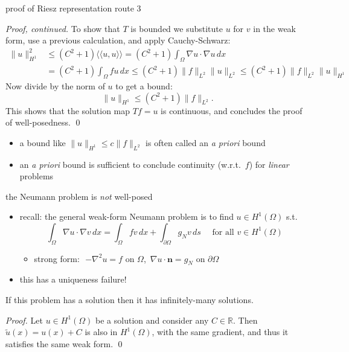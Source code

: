 \documentclass[10pt,
               svgnames,
               hyperref={colorlinks,
                         citecolor=DeepPink4,
                         linkcolor=FireBrick,
                         urlcolor=blue},
               usepdftitle=false]{beamer}
\newcommand{\bn}{\mathbf{n}}
\newcommand{\RR}{\mathbb{R}}
\newcommand{\grad}{\nabla}
\newcommand{\iip}[2]{\langle\!\langle #1, #2 \rangle\!\rangle}
\begin{document}
\begin{frame}{proof of Riesz representation route 3}

\small
\emph{Proof, continued.}
To show that $T$ is bounded we substitute $u$ for $v$ in the weak form, use a previous calculation, and apply Cauchy-Schwarz:
\begin{align*}
\|u\|_{H^1}^2 &\le (C^2+1) \iip{u}{u} = (C^2+1) \int_\Omega \grad u \cdot \grad u\,dx \\
  &= (C^2+1) \int_\Omega f u\,dx \le (C^2+1) \|f\|_{L^2} \|u\|_{L^2} \le (C^2+1) \|f\|_{L^2} \|u\|_{H^1}
\end{align*}
Now divide by the norm of $u$ to get a bound:
    $$\|u\|_{H^1} \le (C^2+1) \|f\|_{L^2}.$$
This shows that the solution map $Tf=u$ is continuous, and concludes the proof of well-posedness. \qed

\bigskip
\bigskip
\begin{itemize}
\item a bound like $\|u\|_{H^1} \le c \|f\|_{L^2}$ is often called an \alert{\emph{a priori} bound}
\item an \emph{a priori} bound is sufficient to conclude continuity (w.r.t.~$f$) for \emph{linear} problems
\end{itemize}
\end{frame}


\begin{frame}{the Neumann problem is \emph{not} well-posed}

\begin{itemize}
\item recall: the general weak-form Neumann problem is to find $u\in H^1(\Omega)$ s.t.
    $$\int_\Omega \grad u \cdot \grad v\,dx = \int_\Omega f v\,dx + \int_{\partial\Omega} g_N v\,ds  \quad \text{ for all } v\in H^1(\Omega)$$

    \begin{itemize}
    \item[$\circ$] strong form:\,\, $- \grad^2 u = f$ on $\Omega$,\, $\grad u\cdot \bn = g_N$ on $\partial \Omega$
    \end{itemize}
\item this has a uniqueness failure!
\end{itemize}

\begin{lemma}
If this problem has a solution then it has infinitely-many solutions.
\end{lemma}

\small
\emph{Proof.}  Let $u\in H^1(\Omega)$ be a solution and consider any $C\in\RR$.  Then $\tilde u(x)=u(x)+C$ is also in $H^1(\Omega)$, with the same gradient, and thus it satisfies the same weak form. \hfill \qed
\end{frame}
\end{document}
